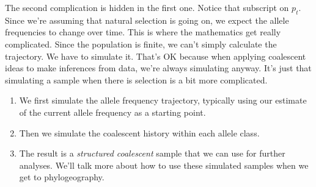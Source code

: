 \documentclass[12pt]{article}
\begin{document}
The second complication is hidden in the first one. Notice that
subscript on $p_t$. Since we're assuming that natural selection is
going on, we expect the allele frequencies to change over time. This
is where the mathematics get really complicated. Since the population
is finite, we can't simply calculate the trajectory. We have to
simulate it. That's OK because when applying coalescent ideas to make
inferences from data, we're always simulating anyway. It's just that
simulating a sample when there is selection is a bit more complicated.

\begin{enumerate}

  \item We first simulate the allele frequency trajectory, typically
    using our estimate of the current allele frequency as a starting
    point.

  \item Then we simulate the coalescent history within each allele
    class.

  \item The result is a {\it structured coalescent}  
    sample that we can use for further analyses. We'll talk more about
    how to use these simulated samples when we get to phylogeography.
    
  \end{enumerate}




\ccLicense
\end{document}

